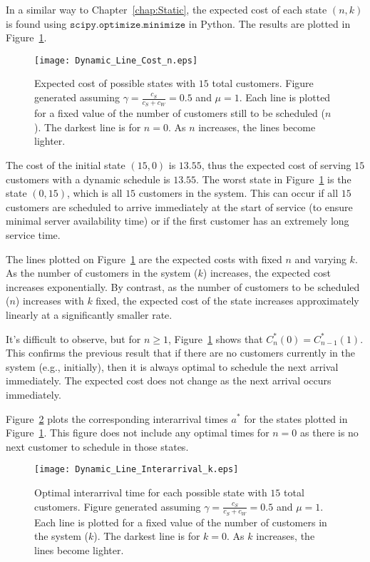 In a similar way to Chapter~\ref{chap:Static}, the expected cost of each state $(n, k)$ is found using $\texttt{scipy.optimize.minimize}$ in Python. The results are plotted in Figure~\ref{fig:Dynamic_Cost_15}.
\begin{figure}[htb]
	\centering
	\texttt{[image: Dynamic\_Line\_Cost\_n.eps]}
	\caption{Expected cost of possible states with $15$ total customers. Figure generated assuming $\gamma = \frac{c_{S}}{c_{S} + c_{W}} = 0.5$ and $\mu = 1$. Each line is plotted for a fixed value of the number of customers still to be scheduled ($n$). The darkest line is for $n = 0$. As $n$ increases, the lines become lighter.}
	\label{fig:Dynamic_Cost_15}
\end{figure}

The cost of the initial state $(15, 0)$ is $13.55$, thus the expected cost of serving $15$ customers with a dynamic schedule is $13.55$. The worst state in Figure~\ref{fig:Dynamic_Cost_15} is the state $(0, 15)$, which is all $15$ customers in the system. This can occur if all $15$ customers are scheduled to arrive immediately at the start of service (to ensure minimal server availability time) or if the first customer has an extremely long service time.

The lines plotted on Figure~\ref{fig:Dynamic_Cost_15} are the expected costs with fixed $n$ and varying $k$. As the number of customers in the system ($k$) increases, the expected cost increases exponentially. By contrast, as the number of customers to be scheduled ($n$) increases with $k$ fixed, the expected cost of the state increases approximately linearly at a significantly smaller rate.

It's difficult to observe, but for $n \geq 1$, Figure~\ref{fig:Dynamic_Cost_15} shows that $C_{n}^{*} (0) = C_{n - 1}^{*} (1)$. This confirms the previous result that if there are no customers currently in the system (e.g., initially), then it is always optimal to schedule the next arrival immediately. The expected cost does not change as the next arrival occurs immediately.

Figure~\ref{fig:Dynamic_Time_15} plots the corresponding interarrival times $a^{*}$ for the states plotted in Figure~\ref{fig:Dynamic_Cost_15}. This figure does not include any optimal times for $n = 0$ as there is no next customer to schedule in those states.
\begin{figure}[htb]
	\centering
	\texttt{[image: Dynamic\_Line\_Interarrival\_k.eps]}
	\caption{Optimal interarrival time for each possible state with $15$ total customers. Figure generated assuming $\gamma = \frac{c_{S}}{c_{S} + c_{W}} = 0.5$ and $\mu = 1$. Each line is plotted for a fixed value of the number of customers in the system ($k$). The darkest line is for $k = 0$. As $k$ increases, the lines become lighter.}
	\label{fig:Dynamic_Time_15}
\end{figure}

